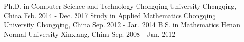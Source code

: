 

\begin{cventries}
    \cventry%
    {Ph.D. in Computer Science and Technology}
    {Chongqing University}
    {Chongqing, China}
    {Feb. 2014 - Dec. 2017} %
    {}
    \vspace{-0.3cm}
	\cventry%
	{Study in Applied Mathematics}
	{Chongqing University}
	{Chongqing, China}
	{Sep. 2012 - Jan. 2014} %
	{}
	\vspace{-0.3cm}
    \cventry%
    {B.S. in Mathematics}
    {Henan Normal University}
    {Xinxiang, China}
    {Sep. 2008 - Jun. 2012} %
    {}
    \vspace{-0.3cm}
\end{cventries}
\vspace{-0.2cm}

